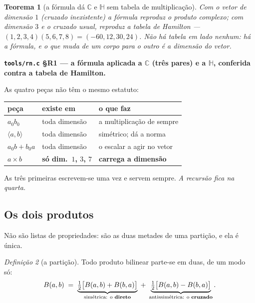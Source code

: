 \documentclass[11pt]{article}
\newcommand{\code}[1]{\texttt{\small #1}}
\newcommand{\C}{\mathbb C}
\newcommand{\Hq}{\mathbb H}
\theoremstyle{plain}
\newtheorem{teorema}{Teorema}
\theoremstyle{remark}
\providecommand{\medido}[1]{\textbf{#1}}
\newtheorem{defn}[teorema]{Definição}
\begin{document}
\begin{teorema}[a fórmula dá $\C$ e $\Hq$ sem tabela de multiplicação]
Com o vetor de dimensão $1$ (cruzado inexistente) a fórmula reproduz o produto complexo; com
dimensão $3$ e o cruzado usual, reproduz a tabela de Hamilton --- $(1,2,3,4)(5,6,7,8) =
(-60,12,30,24)$. \emph{Não há tabela em lado nenhum: há a fórmula, e o que muda de um corpo para o
outro é a dimensão do vetor.}
\end{teorema}
\medido{\code{tools/rn.c} §R1 --- a fórmula aplicada a $\C$ (três pares) e a $\Hq$, conferida
contra a tabela de Hamilton.}

\noindent As quatro peças não têm o mesmo estatuto:

\begin{center}
\begin{tabular}{lll}
\toprule
\textbf{peça} & \textbf{existe em} & \textbf{o que faz} \\
\midrule
$a_0b_0$ & toda dimensão & a multiplicação de sempre \\
$\langle a,b\rangle$ & toda dimensão & simétrico; dá a norma \\
$a_0b+b_0a$ & toda dimensão & o escalar a agir no vetor \\
$a\times b$ & \textbf{só dim.\ $1$, $3$, $7$} & \textbf{carrega a dimensão} \\
\bottomrule
\end{tabular}
\end{center}

\noindent As três primeiras escrevem-se uma vez e servem sempre. \emph{A recursão fica na quarta.}

\subsection{Os dois produtos}

Não são listas de propriedades: são as duas metades de uma partição, e ela é única.

\begin{defn}[a partição]
Todo produto bilinear parte-se em duas, de um modo só:
\[
 B(a,b) \;=\; \underbrace{\tfrac12\bigl[B(a,b)+B(b,a)\bigr]}_{\text{simétrica: o \textbf{direto}}}
 \;+\; \underbrace{\tfrac12\bigl[B(a,b)-B(b,a)\bigr]}_{\text{antissimétrica: o \textbf{cruzado}}}.
\]
\end{defn}
\end{document}
